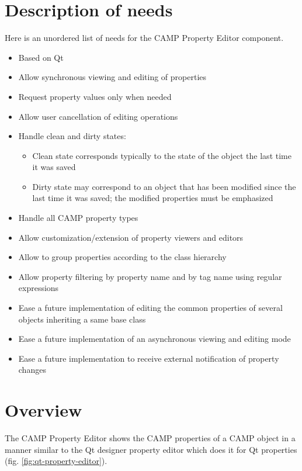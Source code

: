 \documentclass[a4paper, twoside]{report}
\begin{document}
\chapter{Description of needs\label{sec:needs}}

Here is an unordered list of needs for the CAMP Property Editor component.

\begin{itemize}
    \item Based on Qt
    \item Allow synchronous viewing and editing of properties
    \item Request property values only when needed
    \item Allow user cancellation of editing operations
    \item Handle clean and dirty states:
    \begin{itemize}
        \item Clean state corresponds typically to the state of the object the last time it was saved
        \item Dirty state may correspond to an object that has been modified since the last time it
was saved; the modified properties must be emphasized
    \end{itemize}
    \item Handle all CAMP property types
    \item Allow customization/extension of property viewers and editors
    \item Allow to group properties according to the class hierarchy
    \item Allow property filtering by property name and by tag name using regular expressions
    \item Ease a future implementation of editing the common properties of several objects inheriting a same base class
    \item Ease a future implementation of an asynchronous viewing and editing mode
    \item Ease a future implementation to receive external notification of property changes
\end{itemize}

\chapter{Overview\label{sec:overview}}

The CAMP Property Editor shows the CAMP properties of a CAMP object in a manner similar to the Qt
designer property editor which does it for Qt properties (fig. \ref{fig:qt-property-editor}).
\end{document}
